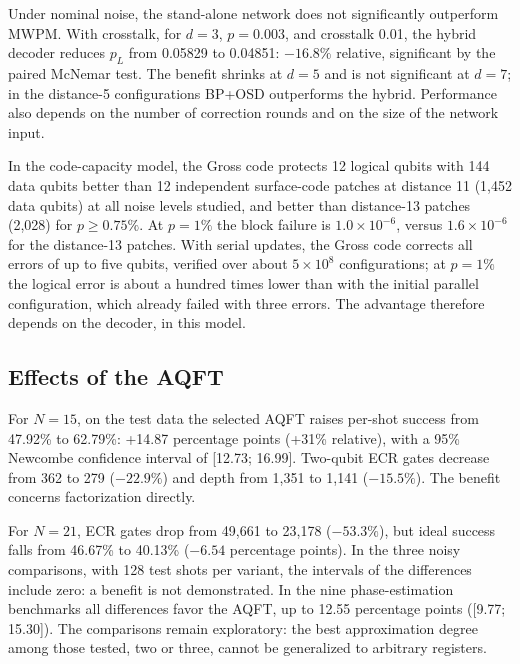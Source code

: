 Under nominal noise, the stand-alone network does not significantly outperform MWPM. With
crosstalk, for \(d = 3\), \(p = 0.003\), and crosstalk 0.01, the hybrid decoder reduces
\(p_L\) from 0.05829 to 0.04851: \(-16.8\%\) relative, significant by the paired McNemar
test. The benefit shrinks at \(d = 5\) and is not significant at \(d = 7\); in the
distance-5 configurations BP+OSD outperforms the hybrid. Performance also depends on the
number of correction rounds and on the size of the network input.

In the code-capacity model, the Gross code protects 12 logical qubits with 144 data qubits
better than 12 independent surface-code patches at distance 11 (1,452 data qubits) at all
noise levels studied, and better than distance-13 patches (2,028) for
\(p \geq 0.75\%\). At \(p = 1\%\) the block failure is \(1.0 \times 10^{-6}\), versus
\(1.6 \times 10^{-6}\) for the distance-13 patches. With serial updates, the Gross code
corrects all errors of up to five qubits, verified over about \(5 \times 10^{8}\)
configurations; at \(p = 1\%\) the logical error is about a hundred times lower than with
the initial parallel configuration, which already failed with three errors. The advantage
therefore depends on the decoder, in this model.

\subsection{Effects of the AQFT}

For \(N = 15\), on the test data the selected AQFT raises per-shot success from 47.92\% to
62.79\%: +14.87 percentage points (+31\% relative), with a 95\% Newcombe confidence
interval of {[}12.73; 16.99{]}. Two-qubit ECR gates decrease from 362 to 279
(\(-22.9\%\)) and depth from 1,351 to 1,141 (\(-15.5\%\)). The benefit concerns
factorization directly.

For \(N = 21\), ECR gates drop from 49,661 to 23,178 (\(-53.3\%\)), but ideal success falls
from 46.67\% to 40.13\% (\(-6.54\) percentage points). In the three noisy comparisons, with
128 test shots per variant, the intervals of the differences include zero: a benefit is
not demonstrated. In the nine phase-estimation benchmarks all differences favor the AQFT,
up to 12.55 percentage points ({[}9.77; 15.30{]}). The comparisons remain exploratory: the
best approximation degree among those tested, two or three, cannot be generalized to
arbitrary registers.
